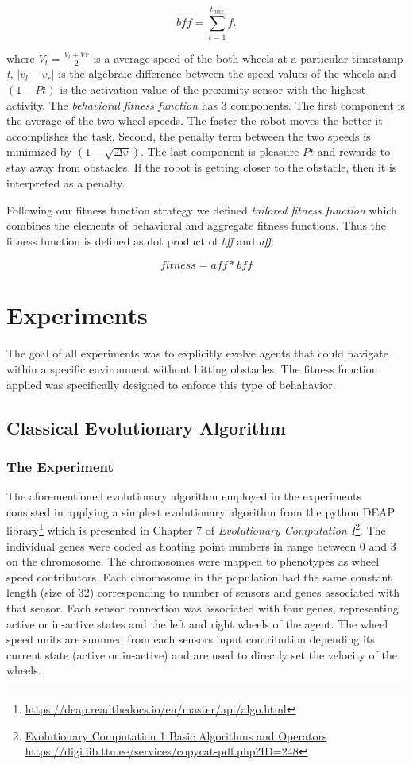 \documentclass[format=acmsmall, review=false, screen=true]{acmart}
\begin{document}
\[ bff = \sum_{t=1}^{t_{max}} f_{t} \]


where \(V_{t} = \frac{V_{l} + V_{}r}{2} \) is a average speed of the both wheels at a particular timestamp \emph{t}, \(|v_{l} - v_{r}|\) is the algebraic difference between the speed values of the wheels and \((1 - P{t})\) is the activation value of the proximity sensor with the highest activity. The \emph{behavioral fitness function} has 3 components. The first component is the average of the two wheel speeds. The faster the robot moves the better it accomplishes the task. Second, the penalty term between the two speeds is minimized by \((1-\sqrt{\Delta v})\). The last component is pleasure \(P{t}\) and rewards to stay away from obstacles. If the robot is getting closer to the obstacle, then it is interpreted as a penalty.

Following our fitness function strategy we defined \emph{tailored fitness function} which combines the elements of behavioral and aggregate fitness functions. Thus the fitness function is defined as dot product of \emph{bff} and \emph{aff}:

\[ fitness = aff * bff \]

\section{Experiments}

The goal of all experiments was to explicitly evolve agents that could navigate within a specific environment without hitting obstacles. The fitness function applied was specifically designed to enforce this type of behahavior.

\subsection{Classical Evolutionary Algorithm}

\subsubsection{The Experiment}

The aforementioned evolutionary algorithm employed in the experiments consisted in applying a simplest evolutionary algorithm from the python DEAP library\footnote{\url{https://deap.readthedocs.io/en/master/api/algo.html}} which is presented in Chapter 7 of \emph{Evolutionary Computation I}\footnote{\url{Evolutionary Computation 1 Basic Algorithms and Operators
https://digi.lib.ttu.ee/services/copycat-pdf.php?ID=248}}. The individual genes were coded as floating point numbers in range between 0 and 3 on the chromosome. The chromosomes were mapped to phenotypes as wheel speed contributors. Each chromosome in the population had the same constant length (size of 32) corresponding to number of sensors and genes associated with that sensor. Each sensor connection was associated with four genes, representing active or in-active states and the left and right wheels of the agent. The wheel speed units are summed from each sensors input contribution depending its current state (active or in-active) and are used to directly set the velocity of the wheels.
\end{document}
